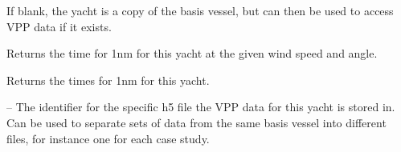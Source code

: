 \documentclass[letterpaper,10pt,english]{sphinxmanual}
\begin{document}
\begin{fulllineitems}
\begin{fulllineitems}
\begin{itemize}
\begin{description}
\end{description}

\end{itemize}

If blank, the yacht is a copy of the basis vessel, but can
then be used to access VPP data if it exists.

\end{fulllineitems}


\begin{fulllineitems}
\label{index:IORAnalysis.Yacht.getSpeed}
Returns the time for 1nm for this yacht at the given wind speed
and angle.

\end{fulllineitems}


\begin{fulllineitems}
\label{index:IORAnalysis.Yacht.getSpeedDF}
Returns the times for 1nm for this yacht.

\end{fulllineitems}


\begin{fulllineitems}
\label{index:IORAnalysis.Yacht.h5ID}
 -- The identifier for the specific h5 file the VPP data for this
yacht is stored in. Can be used to separate sets of data from
the same basis vessel into different files, for instance one
for each case study.

\end{fulllineitems}


\end{fulllineitems}

\end{document}
